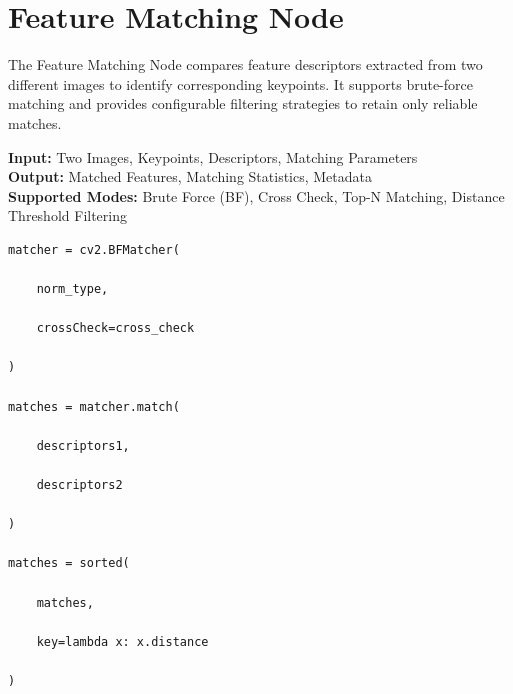\documentclass[a4paper,12pt]{report}
\begin{document}
\section{Feature Matching Node}
\label{sec:feature-matching-node}

The Feature Matching Node compares feature descriptors extracted from two
different images to identify corresponding keypoints. It supports
brute-force matching and provides configurable filtering strategies to
retain only reliable matches.

\noindent \textbf{Input:} Two Images, Keypoints, Descriptors, Matching Parameters \\
\textbf{Output:} Matched Features, Matching Statistics, Metadata \\
\textbf{Supported Modes:} Brute Force (BF), Cross Check, Top-N Matching, Distance Threshold Filtering

\begin{lstlisting}[caption={Core Algorithm}, label={lst:feature-matching-node}]
matcher = cv2.BFMatcher(

    norm_type,

    crossCheck=cross_check

)

matches = matcher.match(

    descriptors1,

    descriptors2

)

matches = sorted(

    matches,

    key=lambda x: x.distance

)
\end{lstlisting}
\end{document}
